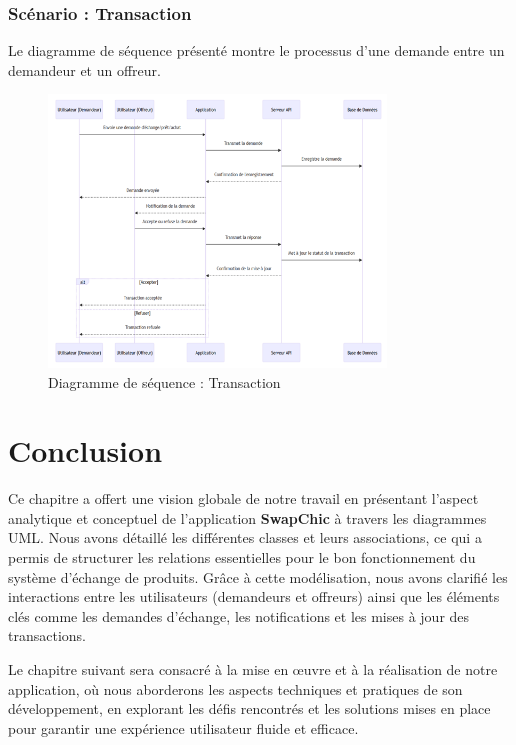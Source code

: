 \documentclass[12pt,a4paper]{report}
\begin{document}
	\subsubsection{Scénario : Transaction}
	Le diagramme de séquence présenté montre le processus d'une demande entre un demandeur et un offreur.
	
	\begin{figure}[H]
		\centering
		\includegraphics[width=0.8\textwidth]{images/transaction_scenario.png}
		\caption{Diagramme de séquence : Transaction}
		\label{fig:sequence_transaction}
	\end{figure}
	
	\section{Conclusion}
	Ce chapitre a offert une vision globale de notre travail en présentant l'aspect analytique et conceptuel de l'application \textbf{SwapChic} à travers les diagrammes UML. Nous avons détaillé les différentes classes et leurs associations, ce qui a permis de structurer les relations essentielles pour le bon fonctionnement du système d'échange de produits. Grâce à cette modélisation, nous avons clarifié les interactions entre les utilisateurs (demandeurs et offreurs) ainsi que les éléments clés comme les demandes d'échange, les notifications et les mises à jour des transactions.
	
	Le chapitre suivant sera consacré à la mise en œuvre et à la réalisation de notre application, où nous aborderons les aspects techniques et pratiques de son développement, en explorant les défis rencontrés et les solutions mises en place pour garantir une expérience utilisateur fluide et efficace.
	
\end{document}
